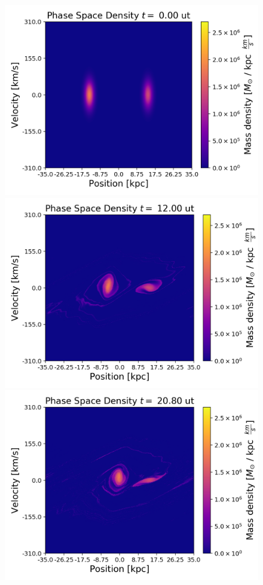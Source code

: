 \begin{figure}[h!]
    \centering
    \includegraphics[scale=0.45]{imag/cBulletPhase0.png}
    \includegraphics[scale=0.45]{imag/cBulletPhase30.png}
    \includegraphics[scale=0.45]{imag/cBulletPhase52.png}

\end{figure}
